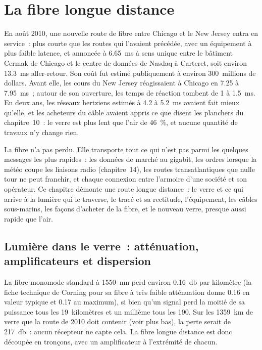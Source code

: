 \chapter{La fibre longue distance}\label{ch:nw:long-haul-fibre}

En août 2010, une nouvelle route de fibre entre Chicago et le New Jersey entra en service~: plus courte que les routes qui l'avaient précédée, avec un équipement à plus faible latence,
et annoncée à \qty{6.65}{\milli\second} à sens unique entre le bâtiment Cermak de Chicago et le centre de données de Nasdaq à Carteret,
soit environ \qty{13.3}{\milli\second} aller-retour. Son coût fut estimé publiquement à environ 300~millions de dollars. Avant elle, les cours du New Jersey
réagissaient à Chicago en 7.25 à \qty{7.95}{\milli\second}~; autour de son ouverture, les temps de réaction tombent de 1 à
\qty{1.5}{\milli\second}. En deux ans, les réseaux hertziens
estimés à 4.2 à \qty{5.2}{\milli\second} avaient fait mieux qu'elle, et les acheteurs du câble avaient appris ce que disent les planchers du chapitre~10~: le verre est
plus lent que l'air de 46~\%, et aucune quantité de travaux n'y change rien.

La fibre n'a pas perdu. Elle transporte tout ce qui n'est pas parmi les quelques messages les plus rapides~: les données de marché au gigabit, les ordres lorsque la météo coupe
les liaisons radio (chapitre~14), les routes transatlantiques que nulle tour ne peut franchir, et chaque connexion entre l'armoire d'une société et son opérateur.
Ce chapitre démonte une route longue distance~: le verre et ce qui arrive à la lumière qui le traverse, le tracé et sa rectitude, l'équipement, les
câbles sous-marins, les façons d'acheter de la fibre, et le nouveau verre, presque aussi rapide que l'air.

\section{Lumière dans le verre~: atténuation, amplificateurs et dispersion}

La fibre monomode standard à \qty{1550}{\nano\metre} perd environ \qty{0.16}{\decibel} par kilomètre (la fiche technique de Corning pour sa fibre à très faible atténuation
donne 0.16 en valeur typique et 0.17 au maximum), si bien qu'un signal perd la moitié de sa puissance tous les 19~kilomètres et un
millième tous les 190. Sur les \qty{1359}{\kilo\metre} de verre que la route de 2010 doit contenir (voir plus bas), la perte serait de
\qty{217}{\decibel}~: aucun récepteur ne capte cela. La fibre longue distance est donc découpée en tronçons, avec un amplificateur à l'extrémité de chacun.

